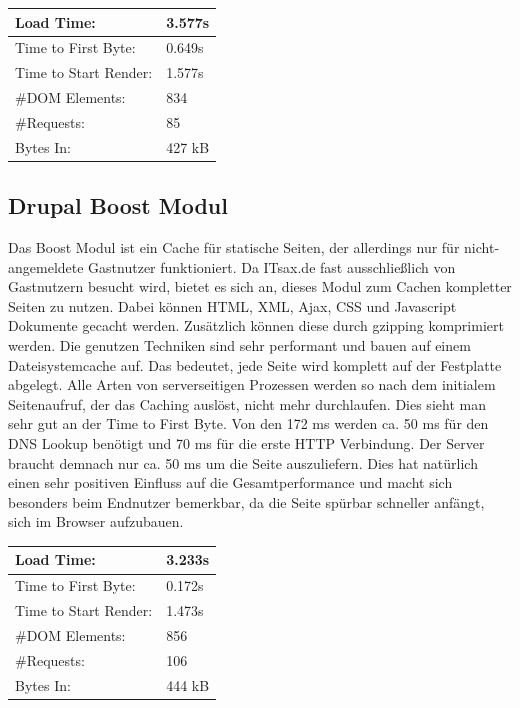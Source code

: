 \begin{table}
\caption{Ergebnis der CSS Aggregation und Komprimierung}
    \begin{longtable}{ | p{3cm} | p{1.5cm} | }
    \hline
    Load Time: 			& 3.577s 	\\ \hline
    Time to First Byte:		& 0.649s  	\\ \hline
    Time to Start Render:	& 1.577s	\\ \hline
    \#DOM Elements:		& 834 		\\ \hline
    \#Requests:			& 85 		\\ \hline
    Bytes In:			& 427 kB 	\\ \hline
    \hline
    \end{longtable}
\end{table}

\subsection{Drupal Boost Modul} 
Das Boost Modul ist ein Cache für statische Seiten, der allerdings nur für nicht-angemeldete Gastnutzer funktioniert. Da ITsax.de fast ausschließlich von Gastnutzern besucht wird, bietet es sich an, dieses Modul zum Cachen kompletter Seiten zu nutzen. Dabei k\"onnen HTML, XML, Ajax, CSS und Javascript Dokumente gecacht werden. Zus\"atzlich k\"onnen diese durch gzipping komprimiert werden.
Die genutzen Techniken sind sehr performant und bauen auf einem Dateisystemcache auf. Das bedeutet, jede Seite wird komplett auf der Festplatte abgelegt. Alle Arten von serverseitigen Prozessen werden so nach dem initialem Seitenaufruf, der das Caching auslöst, nicht mehr durchlaufen. Dies sieht man sehr gut an der Time to First Byte. Von den 172 ms werden ca. 50 ms für den DNS Lookup benötigt und 70 ms für die erste HTTP Verbindung. Der Server braucht demnach nur ca. 50 ms um die Seite auszuliefern. Dies hat natürlich einen sehr positiven Einfluss auf die Gesamtperformance und macht sich besonders beim Endnutzer bemerkbar, da die Seite spürbar schneller anfängt, sich im Browser aufzubauen.

\begin{table}
\caption{Ergebnis der Aktivierung des Drupal Boost Moduls}
    \begin{longtable}{ | p{3cm} | p{1.5cm} | }
    \hline
    Load Time: 			& 3.233s 	\\ \hline
    Time to First Byte:		& 0.172s  	\\ \hline
    Time to Start Render:	& 1.473s	\\ \hline
    \#DOM Elements:		& 856 		\\ \hline
    \#Requests:			& 106 		\\ \hline
    Bytes In:			& 444 kB 	\\ \hline
    \hline
    \end{longtable}
\end{table}


